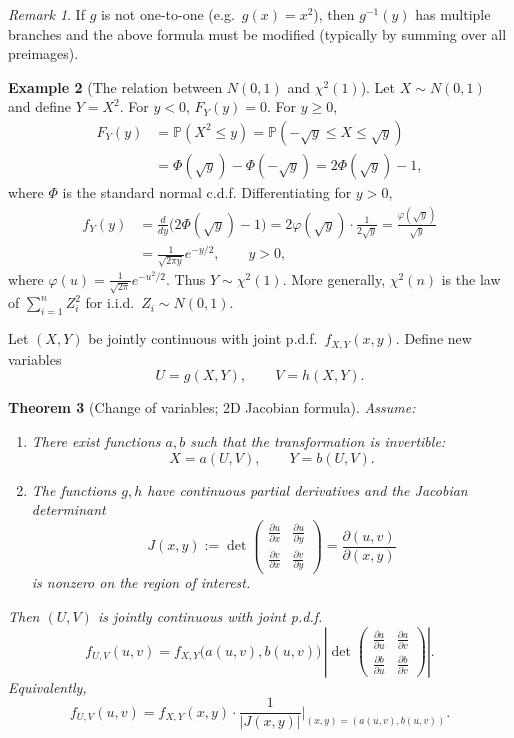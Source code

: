 \documentclass[11pt]{article}
\theoremstyle{plain}
\newtheorem{theorem}{Theorem}[section]
\theoremstyle{definition}
\newtheorem{example}[theorem]{Example}
\theoremstyle{remark}
\newtheorem{remark}[theorem]{Remark}
\begin{document}
	\begin{remark}
		If \(g\) is not one-to-one (e.g.\ \(g(x)=x^2\)), then \(g^{-1}(y)\) has multiple branches and the above formula
		must be modified (typically by summing over all preimages).
	\end{remark}
	
	
	
	\begin{example}[The relation between \(N(0,1)\) and \(\chi^2(1)\)]
		Let \(X\sim N(0,1)\) and define \(Y=X^2\).
		For \(y<0\), \(F_Y(y)=0\). For \(y\ge 0\),
		\begin{align*}
			F_Y(y)
			&=\mathbb{P}(X^2\le y)
			=\mathbb{P}(-\sqrt{y}\le X\le \sqrt{y})\\
			&=\Phi(\sqrt{y})-\Phi(-\sqrt{y})
			=2\Phi(\sqrt{y})-1,
		\end{align*}
		where \(\Phi\) is the standard normal c.d.f.
		Differentiating for \(y>0\),
		\begin{align*}
			f_Y(y)
			&=\frac{d}{dy}\bigl(2\Phi(\sqrt{y})-1\bigr)
			=2\varphi(\sqrt{y})\cdot \frac{1}{2\sqrt{y}}
			=\frac{\varphi(\sqrt{y})}{\sqrt{y}}\\
			&=\frac{1}{\sqrt{2\pi y}}e^{-y/2},\qquad y>0,
		\end{align*}
		where \(\varphi(u)=\frac{1}{\sqrt{2\pi}}e^{-u^2/2}\).
		Thus \(Y\sim \chi^2(1)\). More generally, \(\chi^2(n)\) is the law of \(\sum_{i=1}^n Z_i^2\) for i.i.d.\ \(Z_i\sim N(0,1)\).
	\end{example}
	
	
	
	Let \((X,Y)\) be jointly continuous with joint p.d.f.\ \(f_{X,Y}(x,y)\).
	Define new variables
	\[
	U=g(X,Y),\qquad V=h(X,Y).
	\]
	
	\begin{theorem}[Change of variables; 2D Jacobian formula]
		Assume:
		\begin{enumerate}[label=(\arabic*),leftmargin=2em]
			\item There exist functions \(a,b\) such that the transformation is invertible:
			\[
			X=a(U,V),\qquad Y=b(U,V).
			\]
			\item The functions \(g,h\) have continuous partial derivatives and the Jacobian determinant
			\[
			J(x,y):=\det
			\begin{pmatrix}
				\frac{\partial u}{\partial x} & \frac{\partial u}{\partial y}\\[6pt]
				\frac{\partial v}{\partial x} & \frac{\partial v}{\partial y}
			\end{pmatrix}
			=\frac{\partial(u,v)}{\partial(x,y)}
			\]
			is nonzero on the region of interest.
		\end{enumerate}
		Then \((U,V)\) is jointly continuous with joint p.d.f.
		\[
		f_{U,V}(u,v)=f_{X,Y}\bigl(a(u,v),b(u,v)\bigr)\,
		\left|\det
		\begin{pmatrix}
			\frac{\partial a}{\partial u} & \frac{\partial a}{\partial v}\\[6pt]
			\frac{\partial b}{\partial u} & \frac{\partial b}{\partial v}
		\end{pmatrix}\right|.
		\]
		Equivalently,
		\[
		f_{U,V}(u,v)=f_{X,Y}(x,y)\cdot \frac{1}{|J(x,y)|}\Big|_{(x,y)=(a(u,v),b(u,v))}.
		\]
	\end{theorem}
	
\end{document}
